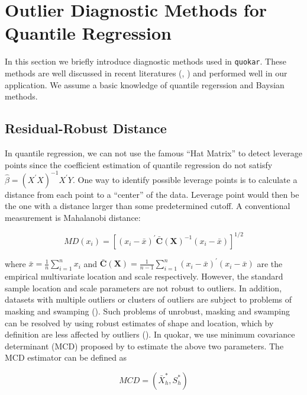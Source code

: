 \documentclass[article]{jss}
\theoremstyle{definition}
\theoremstyle{definition}
\theoremstyle{remark}
\begin{document}
\section{Outlier Diagnostic Methods for Quantile
Regression}\label{outlier-diagnostic-methods-for-quantile-regression}

In this section we briefly introduce diagnostic methods used in
\texttt{quokar}. These methods are well discussed in recent literatures
(\citet{sanchez2013likelihood}, \citet{santos2016bayesian}) and
performed well in our application. We assume a basic knowledge of
quantile regerssion and Baysian methods.

\subsection{Residual-Robust Distance}\label{residual-robust-distance}

In quantile regression, we can not use the famous ``Hat Matrix'' to
detect leverage points since the coefficient estimation of quantile
regression do not satisfy \(\hat{\beta}=(X^{'}X)^{-1}X^{'}Y\). One way
to identify possible leverage points is to calculate a distance from
each point to a ``center'' of the data. Leverage point would then be the
one with a distance larger than some predetermined cutoff. A
conventional measurement is Mahalanobi distance:

\begin{equation}
MD(x_i) = [(x_i-\bar{x})^{'}\bar{\boldsymbol{C}}(\boldsymbol{X})^{-1}(x_i-\bar{x})]^{1/2}
\label{eq:distance}
\end{equation}

where \(\bar{x}=\frac{1}{n}\sum_{i=1}^{n}x_i\) and
\(\bar{\boldsymbol{C}}(\boldsymbol{X})=\frac{1}{n-1}\sum_{i=1}^{n}(x_i-\bar{x})^{'}(x_i-\bar{x})\)
are the empirical multivariate location and scale respectively. However,
the standard sample location and scale parameters are not robust to
outliers. In addition, datasets with multiple outliers or clusters of
outliers are subject to problems of masking and swamping
(\citet{pearson1936efficiency}). Such problems of unrobust, masking and
swamping can be resolved by using robust estimates of shape and
location, which by definition are less affected by outliers
(\citet{rousseeuw1991robust}). In quokar, we use minimum covariance
determinant (MCD) proposed by \citet{rousseeuw1999fast} to estimate the
above two parameters. The MCD estimator can be defined as

\begin{equation}
MCD = (\bar{X}^{*}_{h}, S^{*}_{h})
\label{eq: mcd}
\end{equation}
\end{document}
